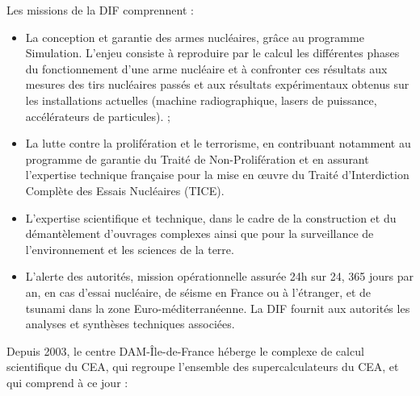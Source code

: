 \documentclass[12pt,a4paper,twoside]{article}
\begin{document}
    Les missions de la DIF comprennent :

    \begin{itemize}[label=\textbullet]
        \item
        La conception et garantie des armes nucléaires, grâce au programme Simulation. L'enjeu consiste à reproduire par le calcul les différentes phases du fonctionnement d'une arme nucléaire et à confronter ces résultats aux mesures des tirs nucléaires passés et aux résultats expérimentaux obtenus sur les installations actuelles (machine radiographique, lasers de puissance, accélérateurs de particules). ;
        \item
        La lutte contre la prolifération et le terrorisme, en contribuant notamment au programme de garantie du Traité de Non-Prolifération et en assurant l'expertise technique française pour la mise en œuvre du Traité d'Interdiction Complète des Essais Nucléaires (TICE).
        \item
        L'expertise scientifique et technique, dans le cadre de la construction et du démantèlement d'ouvrages complexes ainsi que pour la surveillance de l'environnement et les sciences de la terre.
        \item
        L'alerte des autorités, mission opérationnelle assurée 24h sur 24, 365 jours par an, en cas d'essai nucléaire, de séisme en France ou à l'étranger, et de tsunami dans la zone Euro-méditerranéenne. La DIF fournit aux autorités les analyses et synthèses techniques associées.

    \end{itemize}

    Depuis 2003, le centre DAM-Île-de-France héberge le complexe de calcul scientifique du CEA, qui regroupe l’ensemble des supercalculateurs du CEA, et qui comprend à ce jour :
\end{document}

